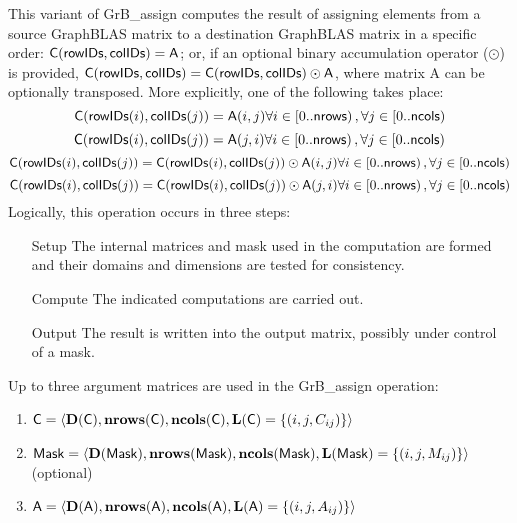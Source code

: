 This variant of {\sf GrB\_assign} computes the result of assigning elements from 
a source GraphBLAS matrix to a destination GraphBLAS matrix in a specific order: 
${\sf C}({\sf rowIDs},{\sf colIDs}) = {\sf A}$; or, if an optional binary accumulation 
operator ($\odot$) is provided, ${\sf C}({\sf rowIDs},{\sf colIDs}) = {\sf C}({\sf rowIDs},{\sf colIDs}) \odot {\sf A}$,  
where matrix {\sf A} can be optionally transposed.
More explicitly, one of the following takes place:
\[
  	{\sf C}({\sf rowIDs}(i),{\sf colIDs}(j)) = {\sf A}(i,j) 
 	\forall i \in \left[0..{\sf nrows}\right), \forall j \in \left[ 0..{\sf ncols}\right)
\]  
\[
  	{\sf C}({\sf rowIDs}(i),{\sf colIDs}(j)) = {\sf A}(j,i) 
 	\forall i \in \left[0..{\sf nrows}\right), \forall j \in \left[ 0..{\sf ncols}\right)
\]  
\[
  	{\sf C}({\sf rowIDs}(i),{\sf colIDs}(j)) = {\sf C}({\sf rowIDs}(i),{\sf colIDs}(j)) \odot {\sf A}(i,j) 
 	\forall i \in \left[0..{\sf nrows}\right), \forall j \in \left[ 0..{\sf ncols}\right)
\]  
\[
  	{\sf C}({\sf rowIDs}(i),{\sf colIDs}(j)) = {\sf C}({\sf rowIDs}(i),{\sf colIDs}(j)) \odot {\sf A}(j,i) 
 	\forall i \in \left[0..{\sf nrows}\right), \forall j \in \left[ 0..{\sf ncols}\right)
\]  
Logically, this operation occurs in three steps:
\begin{enumerate}[leftmargin=0.75in]
\item[Setup] The internal matrices and mask used in the computation are formed 
and their domains and dimensions are tested for consistency.
\item[Compute] The indicated computations are carried out.
\item[Output] The result is written into the output matrix, possibly under 
control of a mask.
\end{enumerate}

Up to three argument matrices are used in the {\sf GrB\_assign} operation:
\begin{enumerate}
	\item ${\sf C} = \langle \bold{D}({\sf C}),\bold{nrows}({\sf C}),\bold{ncols}({\sf C}),\bold{L}({\sf C}) = \{(i,j,C_{ij}) \} \rangle$
	\item ${\sf Mask} = \langle \bold{D}({\sf Mask}),\bold{nrows}({\sf Mask}),\bold{ncols}({\sf Mask}),\bold{L}({\sf Mask}) = \{(i,j,M_{ij}) \} \rangle$ (optional)
	\item ${\sf A} = \langle \bold{D}({\sf A}),\bold{nrows}({\sf A}), \bold{ncols}({\sf A}),\bold{L}({\sf A}) = \{(i,j,A_{ij}) \} \rangle$
\end{enumerate}

